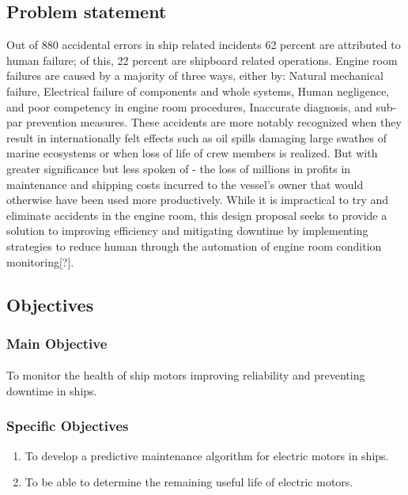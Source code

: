 \subsection{Problem  statement}
 Out of 880 accidental errors in ship related incidents 62 percent are attributed to human failure; of this, 22 percent are shipboard related operations. Engine room failures are caused by a majority of three ways, either by: Natural mechanical failure, Electrical failure of components and whole systems, Human negligence, and poor competency in engine room procedures, Inaccurate diagnosis, and sub-par prevention measures. These accidents are more notably recognized when they result in internationally felt effects such as oil spills damaging large swathes of marine ecosystems or when loss of life of crew members is realized. But with greater significance but less spoken of - the loss of millions in profits in maintenance and shipping costs incurred to the vessel’s owner that would otherwise have been used more productively. While it is impractical to try and eliminate accidents in the engine room, this design proposal seeks to provide a solution to improving efficiency and mitigating downtime by implementing strategies to reduce human through the automation of engine room condition monitoring[?]. 


\subsection{Objectives}
\subsubsection{Main Objective}
\paragraph{}  To monitor the health of ship motors improving reliability and preventing downtime
in ships. 
\subsubsection{Specific Objectives}
\begin{enumerate}
\item  To develop a predictive maintenance algorithm for electric motors in ships.
\item To be able to determine the remaining useful life of electric motors. 

\end{enumerate}
